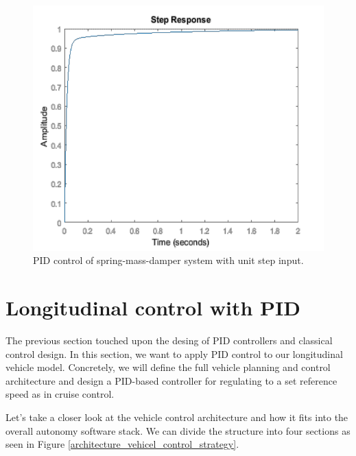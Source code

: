 \begin{figure}[!htb]
\begin{center}
\includegraphics[scale=0.380]{img/longitudinal_control/full_pid_spring_mass_damper_system.jpeg}
\end{center}
\caption{PID control of  spring-mass-damper system with unit step input.}
\label{full_pid_spring_mass_damper_system}
\end{figure}

\section{Longitudinal control with PID}
\label{longitudinal_control_pid}

The previous section touched upon the desing of PID controllers and classical control design. In this section, we want to apply PID control to our longitudinal vehicle model. 
Concretely, we will define the full vehicle planning and control architecture and design a PID-based controller for regulating to a set reference speed as in cruise control. 

Let's take a closer look at the vehicle control architecture and how it fits into the overall autonomy software stack. 
We can divide the structure into four sections as seen in Figure \ref{architecture_vehicel_control_strategy}. 

